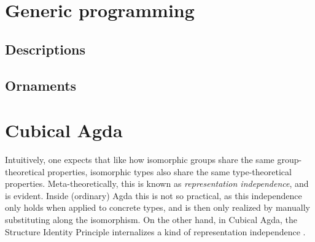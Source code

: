 \section{Generic programming}\label{ssec:bg-desc}

\subsection{Descriptions}


\subsection{Ornaments}



\section{Cubical Agda}

Intuitively, one expects that like how isomorphic groups share the same group-theoretical properties, isomorphic types also share the same type-theoretical properties. Meta-theoretically, this is known as \emph{representation independence}, and is evident. Inside (ordinary) Agda this is not so practical, as this independence only holds when applied to concrete types, and is then only realized by manually substituting along the isomorphism. On the other hand, in Cubical Agda, the Structure Identity Principle internalizes a kind of representation independence \cite{iri}.

